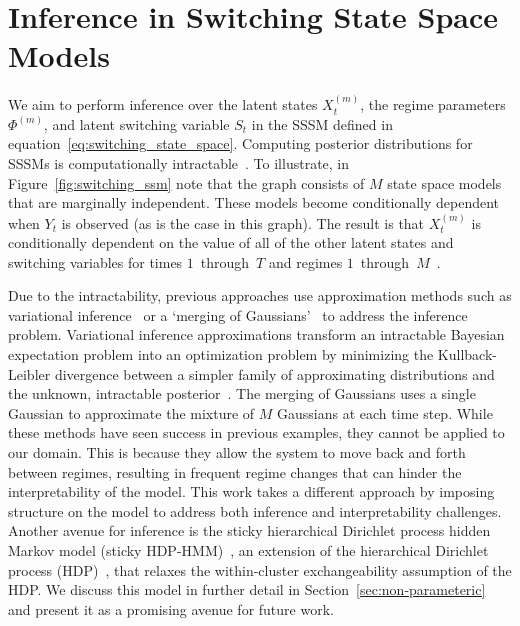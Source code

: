 \section{Inference in Switching State Space Models}\label{sec:inference_for_sssm}
We aim to perform inference over the latent states $X_t^{(m)}$, the regime parameters $\Phi^{(m)}$, and latent switching variable $S_t$ in the SSSM defined in equation~\ref{eq:switching_state_space}. Computing posterior distributions for SSSMs is computationally intractable~\citep{murphy2002dynamic, kim1994dynamic}. To illustrate, in Figure~\ref{fig:switching_ssm} note that the graph consists of $M$ state space models that are marginally independent. These models become conditionally dependent when $Y_t$ is observed (as is the case in this graph). The result is that $X_t^{(m)}$ is conditionally dependent on the value of all of the other latent states and switching variables for times $1$~through~$T$ and regimes $1$~through~$M$~\citep{murphy2002dynamic,ghahramani2000variational}.

Due to the intractability, previous approaches use approximation methods such as variational inference~\citep{ghahramani2000variational} or a `merging of Gaussians'~\citep{kim1999state,murphy2002dynamic} to address the inference problem. Variational inference approximations transform an intractable Bayesian expectation problem into an optimization problem by minimizing the Kullback-Leibler divergence between a simpler family of approximating distributions and the unknown, intractable posterior~\citep{attias2000variational,saul1996exploiting,saul1996mean,blei2003latent}. The merging of Gaussians uses a single Gaussian to approximate the mixture of $M$ Gaussians at each time step. While these methods have seen success in previous examples, they cannot be applied to our domain. This is because they allow the system to move back and forth between regimes, resulting in frequent regime changes that can hinder the interpretability of the model. This work takes a different approach by imposing structure on the model to address both inference and interpretability challenges. Another avenue for inference is the sticky hierarchical Dirichlet process hidden Markov model (sticky HDP-HMM)~\citep{fox2009nonparametric,fox2007hierarchical}, an extension of the hierarchical Dirichlet process (HDP)~\citep{teh2005sharing}, that relaxes the within-cluster exchangeability assumption of the HDP. We discuss this model in further detail in Section~\ref{sec:non-parameteric} and present it as a promising avenue for future work.

